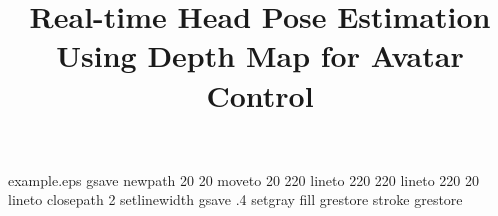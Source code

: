 %

%
%
%
%
%
\begin{filecontents*}{example.eps}
gsave
newpath
  20 20 moveto
  20 220 lineto
  220 220 lineto
  220 20 lineto
closepath
2 setlinewidth
gsave
  .4 setgray fill
grestore
stroke
grestore
\end{filecontents*}
%
\RequirePackage{fix-cm}
%

\documentclass[twocolumn]{svjour3}          %
%
\smartqed  %
%
\usepackage{graphicx}
\usepackage{amsmath}
%
%
%
%
%


\title{Real-time Head Pose Estimation Using Depth Map for Avatar Control%
}


